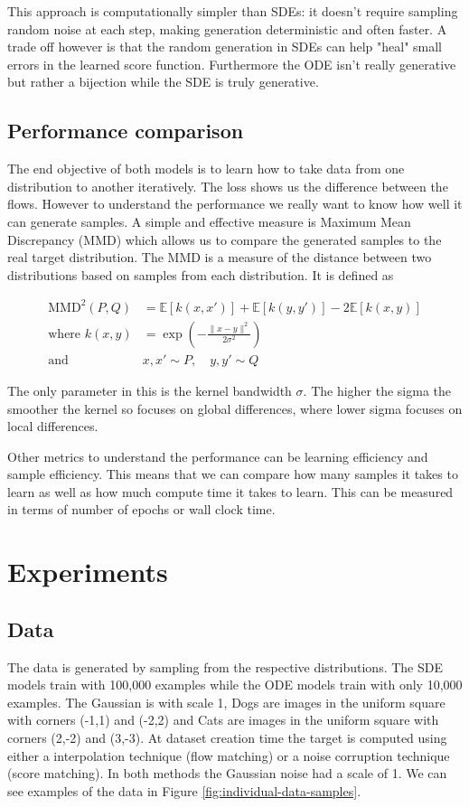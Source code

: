 \documentclass[conference,a4paper]{IEEEtran}
\begin{document}
This approach is computationally simpler than SDEs: it doesn't require sampling random noise at each step, making generation deterministic and often faster. A trade off however is that the random generation in SDEs can help "heal" small errors in the learned score function. Furthermore the ODE isn't really generative but rather a bijection while the SDE is truly generative.

\subsection{Performance comparison} 

The end objective of both models is to learn how to take data from one distribution to another iteratively. The loss shows us the difference between the flows. However to understand the performance we really want to know how well it can generate samples. A simple and effective measure is Maximum Mean Discrepancy (MMD) \cite{grettonKernelMethodTwoSample2008} which allows us to compare the generated samples to the real target distribution. The MMD is a measure of the distance between two distributions based on samples from each distribution. It is defined as

\begin{align}
    \text{MMD}^2(P, Q) &= \mathbb{E}[k(x, x')] + \mathbb{E}[k(y, y')] - 2\mathbb{E}[k(x, y)]\\
    \text{where } k(x, y) &= \exp\left(-\frac{\|x - y\|^2}{2\sigma^2}\right)\\
    \text{and } &x, x' \sim P, \quad y, y' \sim Q 
\end{align}

The only parameter in this is the kernel bandwidth $\sigma$. The higher the sigma the smoother the kernel so focuses on global differences, where lower sigma focuses on local differences.

Other metrics to understand the performance can be learning efficiency and sample efficiency. This means that we can compare how many samples it takes to learn as well as how much compute time it takes to learn. This can be measured in terms of number of epochs or wall clock time.

\section{Experiments}

\subsection{Data}
The data is generated by sampling from the respective distributions. The SDE models train with 100,000 examples while the ODE models train with only 10,000 examples. The Gaussian is with scale 1, Dogs are images in the uniform square with corners (-1,1) and (-2,2) and Cats are images in the uniform square with corners (2,-2) and (3,-3). At dataset creation time the target is computed using either a interpolation technique (flow matching) or a noise corruption technique (score matching). In both methods the Gaussian noise had a scale of 1. We can see examples of the data in Figure \ref{fig:individual-data-samples}.
\end{document}
